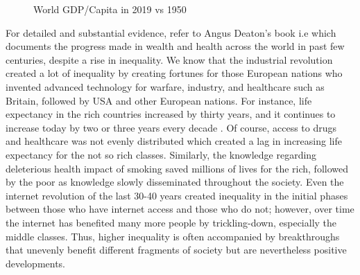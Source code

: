 \documentclass[12pt]{article}
\newcommand{\1}{\mathbbm 1}
\begin{document}
			\begin{figure}[H]
			\begin{center}
				\centering
				\hfill%
			\end{center}
			\caption{World GDP/Capita in 2019 vs 1950}
		\end{figure}
		
		
		
		
		
		
		For detailed and substantial evidence, refer to Angus Deaton's book i.e \cite{deaton2013great} which documents the progress made in wealth and health across the world in past few centuries, despite a rise in inequality. We know that the industrial revolution created a lot of inequality by creating fortunes for those European nations who invented advanced technology for warfare, industry, and healthcare such as Britain, followed by USA and other European nations. For instance, life expectancy in the rich countries increased by thirty years, and it continues to increase today by two or three years every decade \cite{deaton2013great}. Of course, access to drugs and healthcare was not evenly distributed which created a lag in increasing life expectancy for the not so rich classes. Similarly, the knowledge regarding deleterious health impact of smoking saved millions of lives for the rich, followed by the poor as knowledge slowly disseminated throughout the society. Even the internet revolution of the last 30-40 years created inequality in the initial phases between those who have internet access and those who do not; however, over time the internet has benefited many more people by trickling-down, especially the middle classes. Thus, higher inequality is often accompanied by breakthroughs that unevenly benefit different fragments of society but are nevertheless positive developments. 
		
\end{document}

